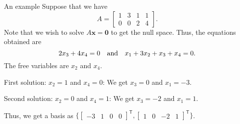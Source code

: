\documentclass[dvipsnames]{beamer}
\newcommand{\TT}{\mathsf{T}}
\theoremstyle{definition}
\begin{document}
\begin{frame}{An example}
    Suppose that we have
    \begin{equation*} 
        A = 
        \begin{bmatrix}
            \boxed{1} & 3 & 1 & 1 \\
            0 & 0 & \boxed{2} & 4
        \end{bmatrix}.
    \end{equation*} \pause
    Note that we wish to solve $A \mathbf{x} = \mathbf{0}$ to get the null space. \pause Thus, the equations obtained are
    \begin{equation*} 
        2x_{3} + 4x_{4} = 0 \quad\text{and}\quad x_{1} + 3x_{2} + x_{3} + x_{4} = 0.
    \end{equation*} \pause
    The free variables are \pause $x_{2}$ and $x_{4}$. \pause

    First solution: $x_{2} = 1$ and $x_{4} = 0$: \pause We get $x_{3} = 0$ and $x_{1} = -3$. \pause

    Second solution: $x_{2} = 0$ and $x_{4} = 1$: \pause We get $x_{3} = -2$ and $x_{1} = 1$. \pause

    Thus, we get a basis as $\{\begin{bmatrix}
        -3 & 1 & 0 & 0
    \end{bmatrix}^{\TT}, \begin{bmatrix}
        1 & 0 & -2 & 1
    \end{bmatrix}^{\TT}\}$.
\end{frame}
\end{document}
